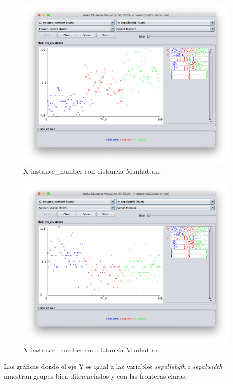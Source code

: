 \documentclass[11pt]{exam}
\begin{document}
\begin{questions}
\begin{figure}[h]
	\centering
	\includegraphics[scale=0.4]{hc_sepallebgth.png}
	\caption{X instance\_number con distancia Manhattan.}
	\label{Captura_9}
\end{figure}

\begin{figure}[h]
	\centering
	\includegraphics[scale=0.5]{hc_sepalwidth.png}
	\caption{X instance\_number con distancia Manhattan.}
	\label{Captura_10}
\end{figure}

Las gráficas donde el eje Y es igual a las variables \textit{sepallebgth} i \textit{sepalwidth} muestran grupos bien diferenciados y con las fronteras claras.

\end{questions}
\end{document}
